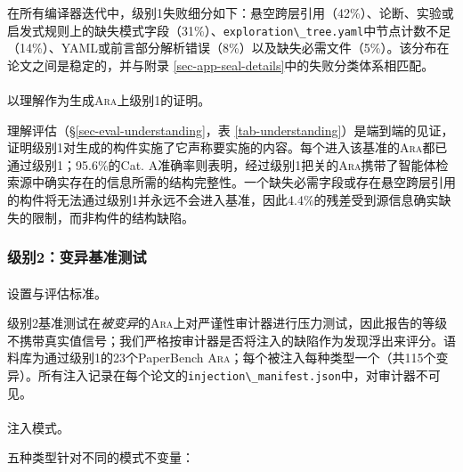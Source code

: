 \documentclass[
]{article}
\makeatletter
\let\oldparagraph\paragraph
\renewcommand{\paragraph}{
    \@ifstar
      \xxxParagraphStar
      \xxxParagraphNoStar
  }
\newcommand{\xxxParagraphStar}[1]{\oldparagraph*{#1}\mbox{}}
\newcommand{\xxxParagraphNoStar}[1]{\oldparagraph{#1}\mbox{}}
\newcommand{\passthrough}[1]{#1}
\theoremstyle{definition}
\newcommand{\ara}{\textsc{Ara}}
\makeatother
\begin{document}
在所有编译器迭代中，级别1失败细分如下：悬空跨层引用（42\%）、论断、实验或启发式规则上的缺失模式字段（31\%）、\passthrough{\lstinline!exploration\_tree.yaml!}中节点计数不足（14\%）、YAML或前言部分解析错误（8\%）以及缺失必需文件（5\%）。该分布在论文之间是稳定的，并与附录
\ref{sec-app-seal-details}中的失败分类体系相匹配。

\paragraph{\texorpdfstring{以理解作为生成\ara{}上级别1的证明。}{以理解作为生成上级别1的证明。}}\label{ux4ee5ux7406ux89e3ux4f5cux4e3aux751fux6210b58fc729-690b-4000-b19f-365a4093b2ff7b7b3c207465726d20617261203e7d7dux4e0aux7ea7ux522b1ux7684ux8bc1ux660e}

理解评估（\S\ref{sec-eval-understanding}，表
\ref{tab-understanding}）是端到端的见证，证明级别1对生成的构件实施了它声称要实施的内容。每个进入该基准的\ara{}都已通过级别1；95.6\%的Cat.
A准确率则表明，经过级别1把关的\ara{}携带了智能体检索源中确实存在的信息所需的结构完整性。一个缺失必需字段或存在悬空跨层引用的构件将无法通过级别1并永远不会进入基准，因此4.4\%的残差受到源信息确实缺失的限制，而非构件的结构缺陷。

\subsubsection{级别2：变异基准测试}\label{sec-app-seal-eval-l2}

\paragraph{设置与评估标准。}\label{ux8bbeux7f6eux4e0eux8bc4ux4f30ux6807ux51c6}

级别2基准测试在\emph{被变异}的\ara{}上对严谨性审计器进行压力测试，因此报告的等级不携带真实值信号；我们严格按审计器是否将注入的缺陷作为发现浮出来评分。语料库为通过级别1的23个PaperBench
\ara{}；每个被注入每种类型一个（共115个变异）。所有注入记录在每个论文的\passthrough{\lstinline!injection\_manifest.json!}中，对审计器不可见。

\paragraph{注入模式。}\label{ux6ce8ux5165ux6a21ux5f0f}

五种类型针对不同的模式不变量：
\end{document}
